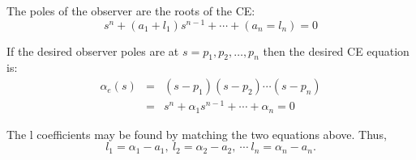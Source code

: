The poles of the observer are the roots of the CE:
\[
s^n+(a_1+l_1)s^{n-1}+\cdots+(a_n=l_n)=0
\]
 

If the desired observer poles are at  $s=p_1,p_2,\ldots,p_n$ 
then the desired CE equation is:
\begin{eqnarray*}
	\alpha_e(s) & = & (s-p_1)(s-p_2)\cdots(s-p_n) \\
	            & = & s^n + \alpha_1s^{n-1} + \cdots + \alpha_n = 0
\end{eqnarray*}
 

The  l  coefficients may be found by matching the two equations above. 
Thus,
\[
l_1=\alpha_1-a_1,\ l_2=\alpha_2-a_2,\ \cdots\ l_n=\alpha_n-a_n.
\]


 
 

\endinput

